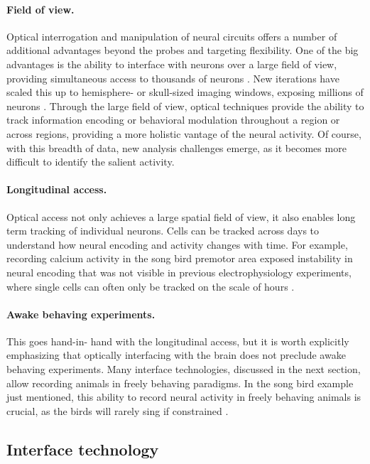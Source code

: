 \paragraph{Field of view.} Optical interrogation and manipulation 
of neural circuits offers a number of additional advantages 
beyond the probes and targeting flexibility. One of the big 
advantages is the ability to interface with neurons over a 
large field of view, providing simultaneous access to thousands 
of neurons \cite{Mohammed:2016fq}. New iterations have scaled 
this up to hemisphere- or skull-sized imaging windows, exposing 
millions of neurons \cite{Kim:2016hh}. Through the large field 
of view, optical techniques provide the ability to track 
information encoding or behavioral modulation throughout a 
region or across regions, providing a more holistic vantage of
the neural activity. Of course, with this breadth of data, new 
analysis challenges emerge, as it becomes more difficult to 
identify the salient activity.

\paragraph{Longitudinal access.} Optical access not only 
achieves a large spatial field of view, it also enables long
term tracking of individual neurons. Cells can be tracked 
across days to understand how neural encoding and activity 
changes with time. For example, recording calcium activity 
in the song bird premotor area exposed instability in 
neural encoding \cite{Liberti:2016bc} that was not visible in 
previous electrophysiology experiments, where single cells 
can often only be tracked on the scale of hours 
\cite{Hahnloser:2002hj}.

\paragraph{Awake behaving experiments.} This goes hand-in-
hand with the longitudinal access, but it is worth 
explicitly emphasizing that optically interfacing with the 
brain does not preclude awake behaving 
experiments. Many interface technologies, discussed in the 
next section, allow recording animals in freely behaving 
paradigms. In the song bird example just mentioned, this 
ability to record neural activity in freely behaving animals 
is crucial, as the birds will rarely sing if constrained 
\cite{LibertiIII:2017df}.

\subsection{Interface technology}

